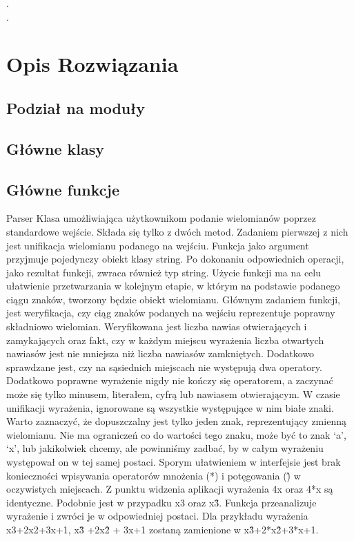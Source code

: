\documentclass[twoside,a4paper]{book}
\begin{document}
.\\
.\\

\chapter{Opis Rozwiązania}
\section{Podział na moduły}
\section{Główne klasy}
\section{Główne funkcje}
Parser
Klasa umożliwiająca użytkownikom podanie wielomianów poprzez standardowe wejście. Składa się tylko z dwóch metod.
Zadaniem pierwszej z nich jest unifikacja wielomianu podanego na wejściu. Funkcja jako argument przyjmuje pojedynczy obiekt klasy string. Po dokonaniu odpowiednich operacji, jako rezultat funkcji, zwraca również typ string. Użycie funkcji ma na celu ułatwienie przetwarzania w kolejnym etapie, w którym na podstawie podanego ciągu znaków, tworzony będzie obiekt wielomianu. Głównym zadaniem funkcji, jest weryfikacja, czy ciąg znaków podanych na wejściu reprezentuje poprawny składniowo wielomian. Weryfikowana jest liczba nawias otwierających i zamykających oraz fakt, czy w każdym miejscu wyrażenia liczba otwartych nawiasów jest nie mniejsza niż liczba nawiasów zamkniętych. Dodatkowo sprawdzane jest, 
czy na sąsiednich miejscach nie występują dwa operatory. Dodatkowo poprawne wyrażenie nigdy nie kończy się operatorem, a zaczynać może się tylko minusem, literałem, cyfrą lub nawiasem otwierającym. W czasie unifikacji wyrażenia, ignorowane są wszystkie występujące w nim białe znaki. Warto zaznaczyć, że dopuszczalny jest tylko jeden znak, reprezentujący zmienną wielomianu. Nie ma ograniczeń co do wartości tego znaku, może być to znak ‘a’, ‘x’, lub jakikolwiek chcemy, ale powinniśmy zadbać, by w całym wyrażeniu występował on w tej samej postaci. Sporym ułatwieniem w interfejsie jest brak konieczności 
wpisywania operatorów mnożenia (*) i potęgowania (\^) w oczywistych miejscach. Z punktu widzenia aplikacji wyrażenia 4x oraz 4*x są identyczne. Podobnie jest w przypadku x3 oraz x\^3. Funkcja
przeanalizuje wyrażenie i zwróci je w odpowiedniej postaci. Dla przykładu wyrażenia x3+2x2+3x+1, x\^3 +2x\^2 + 3x+1 zostaną zamienione w x\^3+2*x\^2+3*x+1.
\end{document}
